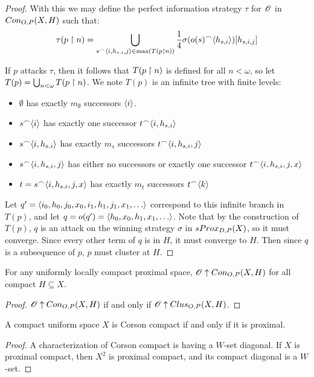 \begin{proof}
  With this we may define the perfect information strategy $\tau$ for $\mathscr{O}$ in $Con_{O,P}(X,H)$ such that:
  \[
    \tau(p\restriction n) = \bigcup_{s^\frown\langle i,h_{s,i},j\rangle\in\max(T(p\restriction n))} \frac{1}{4}\sigma(o(s)^\frown\langle h_{s,i}\rangle)[h_{s,i,j}]
  \]

  If $p$ attacks $\tau$, then it follows that $T(p\restriction n)$ is defined for all $n<\omega$, so let $T(p)=\bigcup_{n<\omega} T(p\restriction n)$. We note $T(p)$ is an infinite tree with finite levels:
    \begin{itemize}
      \item $\emptyset$ has exactly $m_\emptyset$ successors $\langle i\rangle$.
      \item $s^\frown\langle i\rangle$ has exactly one successor $t^\frown\langle i,h_{s,i}\rangle$
      \item $s^\frown\langle i,h_{s,i}\rangle$ has exactly $m_s$ successors $t^\frown\langle i,h_{s,i},j\rangle$
      \item $s^\frown\langle i,h_{s,i},j\rangle$ has either no successors or exactly one successor $t^\frown\langle i,h_{s,i},j,x\rangle$
      \item $t=s^\frown\langle i,h_{s,i},j,x\rangle$ has exactly $m_t$ successors $t^\frown\langle k\rangle$
    \end{itemize}

  Let $q'=\<i_0,h_0,j_0,x_0,i_1,h_1,j_1,x_1,\dots\>$ correspond to this infinite branch in $T(p)$, and let $q=o(q')=\<h_0,x_0,h_1,x_1,\dots\>$. Note that by the construction of $T(p)$, $q$ is an attack on the winning strategy $\sigma$ in $sProx_{D,P}(X)$, so it must converge. Since every other term of $q$ is in $H$, it must converge to $H$. Then since $q$ is a subsequence of $p$, $p$ must cluster at $H$.
\end{proof}


\begin{corollary}
  For any uniformly locally compact proximal space, $\mathscr{O}\uparrow Con_{O,P}(X,H)$ for all compact $H\subseteq X$.
\end{corollary}

\begin{proof}
  $\mathscr{O} \uparrow Con_{O,P}(X,H)$ if and only if $\mathscr{O} \uparrow Clus_{O,P}(X,H)$.
\end{proof}

\begin{corollary}
  A compact uniform space $X$ is Corson compact if and only if it is proximal.
\end{corollary}

\begin{proof}
  A characterization of Corson compact is having a $W$-set diagonal. If $X$ is proximal compact, then $X^2$ is proximal compact, and its compact diagonal is a $W$-set.
\end{proof}


